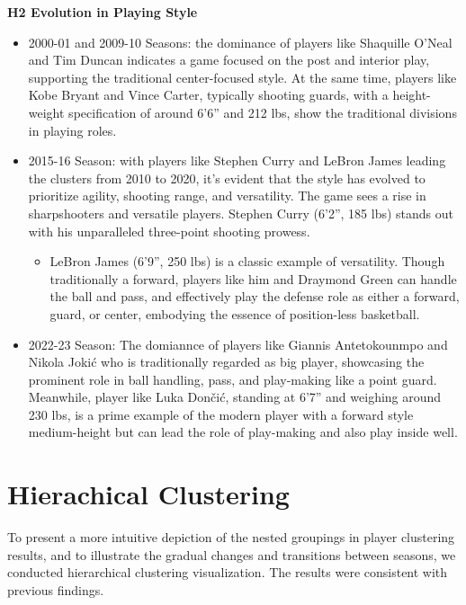 \documentclass[
]{book}
\providecommand{\tightlist}{%
  \setlength{\itemsep}{0pt}\setlength{\parskip}{0pt}}
\begin{document}
\textbf{H2 Evolution in Playing Style}

\begin{itemize}
\tightlist
\item
  2000-01 and 2009-10 Seasons: the dominance of players like Shaquille O'Neal and Tim Duncan indicates a game focused on the post and interior play, supporting the traditional center-focused style. At the same time, players like Kobe Bryant and Vince Carter, typically shooting guards, with a height-weight specification of around 6'6'' and 212 lbs, show the traditional divisions in playing roles.
\item
  2015-16 Season: with players like Stephen Curry and LeBron James leading the clusters from 2010 to 2020, it's evident that the style has evolved to prioritize agility, shooting range, and versatility. The game sees a rise in sharpshooters and versatile players. Stephen Curry (6'2'', 185 lbs) stands out with his unparalleled three-point shooting prowess.

  \begin{itemize}
  \tightlist
  \item
    LeBron James (6'9'', 250 lbs) is a classic example of versatility. Though traditionally a forward, players like him and Draymond Green can handle the ball and pass, and effectively play the defense role as either a forward, guard, or center, embodying the essence of position-less basketball.
  \end{itemize}
\item
  2022-23 Season: The domiannce of players like Giannis Antetokounmpo and Nikola Jokić who is traditionally regarded as big player, showcasing the prominent role in ball handling, pass, and play-making like a point guard. Meanwhile, player like Luka Dončić, standing at 6'7'' and weighing around 230 lbs, is a prime example of the modern player with a forward style medium-height but can lead the role of play-making and also play inside well.
\end{itemize}

\hypertarget{hierachical-clustering}{%
\section{Hierachical Clustering}\label{hierachical-clustering}}

To present a more intuitive depiction of the nested groupings in player clustering results, and to illustrate the gradual changes and transitions between seasons, we conducted hierarchical clustering visualization. The results were consistent with previous findings.
\end{document}
